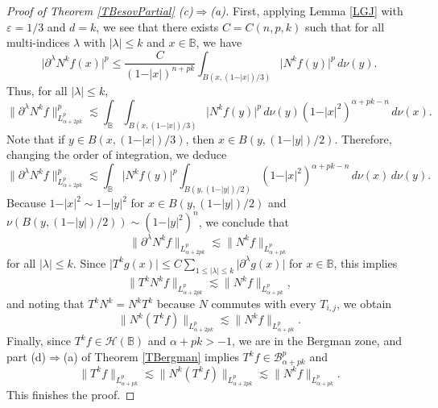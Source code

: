 \documentclass{amsart}
\theoremstyle{definition}
\theoremstyle{remark}
\begin{document}
\begin{proof}[Proof of Theorem \ref{TBesovPartial} (c)$\Rightarrow$(a)]
First, applying Lemma \ref{LGJ} with $\varepsilon=1/3$ and $d=k$,
we see that there exists $C=C(n,p,k)$ such that for all
multi-indices $\lambda$ with $\vert\lambda\vert\le k$ and
$x\in\mathbb B$, we have
\begin{equation*}
\bigl\vert\partial^\lambda N^k f(x)\bigr\vert^p
\le \frac{C}{(1-\vert x\vert)^{n+pk}}
\int_{B(x,(1-\vert x\vert)/3)} \vert N^k f(y)\vert^p\,d\nu(y).
\end{equation*}
Thus, for all $\vert\lambda\vert\le k$,
\begin{equation*}
\|\partial^\lambda N^k f\|^p_{L^p_{\alpha+2pk}}
\lesssim \int_{\mathbb B} \int_{B(x,(1-\vert x\vert)/3)}
\vert N^k f(y)\vert^p\,d\nu(y)(1-\vert x\vert^2)^{\alpha+pk-n}\,d\nu(x).
\end{equation*}
Note that if $y\in B(x,(1-\vert x\vert)/3)$, then $x\in B(y,(1-\vert y\vert)/2)$.
Therefore, changing the order of integration, we deduce
\begin{equation*}
\|\partial^\lambda N^k f\|^p_{L^p_{\alpha+2pk}}
\lesssim \int_{\mathbb B}\vert N^k f(y)\vert^p
\int_{B(y,(1-\vert y\vert)/2)}(1-\vert x\vert^2)^{\alpha+pk-n}\,d\nu(x)\,d\nu(y).
\end{equation*}
Because
$1-\vert x\vert^2\sim1-\vert y\vert^2$ for $x\in B(y,(1-\vert y\vert)/2)$
and $\nu(B(y,(1-\vert y\vert)/2))\sim (1-\vert y\vert^2)^n$, we conclude that
\begin{equation*}
\|\partial^\lambda N^k f\|_{L^p_{\alpha+2pk}}
\lesssim \|N^k f\|_{L^p_{\alpha+pk}}
\end{equation*}
for all $\vert\lambda\vert\le k$.
Since
$\vert T^k g(x)\vert
\le C\sum_{1\le\vert\lambda\vert\le k}\vert\partial^\lambda g(x)\vert$
for $x\in\mathbb B$, this implies
\begin{equation*}
\|T^k N^k f\|_{L^p_{\alpha+2pk}}
\lesssim \|N^k f\|_{L^p_{\alpha+pk}},
\end{equation*}
and noting that $T^k N^k=N^k T^k$ because $N$ commutes with every $T_{i,j}$,
we obtain
\begin{equation*}
\|N^k(T^k f)\|_{L^p_{\alpha+2pk}}
\lesssim \|N^k f\|_{L^p_{\alpha+pk}}.
\end{equation*}
Finally, since $T^k f\in\mathcal H(\mathbb B)$ and $\alpha+pk>-1$, we are
in the Bergman zone, and part (d)$\Rightarrow$(a) of Theorem \ref{TBergman}
implies $T^k f\in\mathcal B^p_{\alpha+pk}$ and
\begin{equation*}
\|T^k f\|_{L^p_{\alpha+pk}}
\lesssim \|N^k(T^k f)\|_{L^p_{\alpha+2pk}}
\lesssim \|N^k f\|_{L^p_{\alpha+pk}}.
\end{equation*}
This finishes the proof.
\end{proof}
\end{document}
